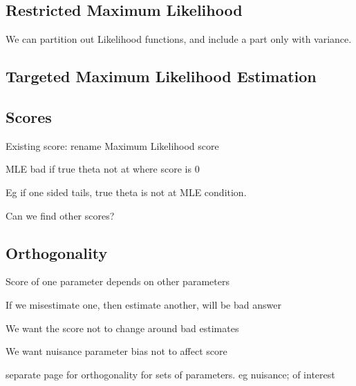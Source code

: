 
\subsection{Restricted Maximum Likelihood}

We can partition out Likelihood functions, and include a part only with variance.

\subsection{Targeted Maximum Likelihood Estimation}

\subsection{Scores}

Existing score: rename Maximum Likelihood score

MLE bad if true theta not at where score is 0

Eg if one sided tails, true theta is not at MLE condition.

Can we find other scores?

\subsection{Orthogonality}
Score of one parameter depends on other parameters

If we misestimate one, then estimate another, will be bad answer

We want the score not to change around bad estimates

We want nuisance parameter bias not to affect score

separate page for orthogonality for sets of parameters. eg nuisance; of interest

